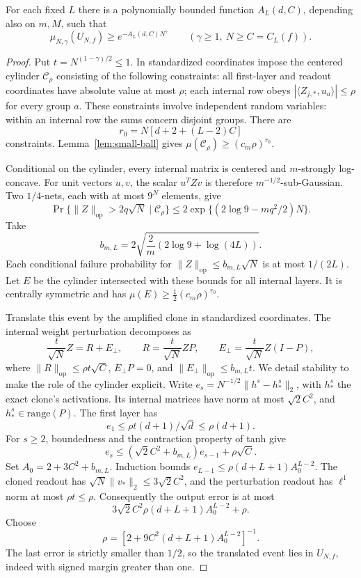 \begin{proposition}\label{prop:target-mass}
For each fixed $L$ there is a polynomially bounded function $A_L(d,C)$,
depending also on $m,M$, such that
\begin{equation}\label{eq:target-mass}
 \mu_{N,\gamma}(U_{N,f})\geq e^{-A_L(d,C)N^\gamma}
 \qquad(\gamma\geq1,\ N\geq C=C_L(f)).
\end{equation}
\end{proposition}
\begin{proof}
Put $t=N^{(1-\gamma)/2}\leq1$. In standardized coordinates impose the
centered cylinder $\mathcal C_\rho$ consisting of the following constraints:
all first-layer and readout coordinates have absolute value at most $\rho$;
each internal row obeys $|\langle Z_{j,*},u_a\rangle|\leq\rho$ for
every group $a$. These constraints involve independent random variables:
within an internal row the sums concern disjoint groups. There are
\[
 r_0=N[d+2+(L-2)C]
\]
constraints. Lemma~\ref{lem:small-ball} gives
$\mu(\mathcal C_\rho)\geq(c_m\rho)^{r_0}$.

Conditional on the cylinder, every internal matrix is centered and
$m$-strongly log-concave. For unit vectors $u,v$, the scalar $u^TZv$
is therefore $m^{-1/2}$-sub-Gaussian. Two $1/4$-nets, each with at most
$9^N$ elements, give
\[
 \Pr\{\|Z\|_{\mathrm{op}}>2q\sqrt N\mid\mathcal C_\rho\}
 \leq2\exp\{(2\log9-mq^2/2)N\}.
\]
Take
\[
 b_{m,L}=2\sqrt{\frac2m(2\log9+\log(4L))}.
\]
Each conditional failure probability for
$\|Z\|_{\mathrm{op}}\leq b_{m,L}\sqrt N$ is at most $1/(2L)$.
Let $E$ be the cylinder intersected with these bounds for all internal
layers. It is centrally symmetric and has
$\mu(E)\geq\tfrac12(c_m\rho)^{r_0}$.

Translate this event by the amplified clone in standardized coordinates.
The internal weight perturbation decomposes as
\[
 \frac t{\sqrt N}Z=R+E_\perp,
 \qquad R=\frac t{\sqrt N}ZP,
 \qquad E_\perp=\frac t{\sqrt N}Z(I-P),
\]
where
$\|R\|_{\mathrm{op}}\leq\rho t\sqrt C$,
$E_\perp P=0$, and $\|E_\perp\|_{\mathrm{op}}\leq b_{m,L}t$.
We detail stability to make the role of the cylinder explicit. Write
$e_s=N^{-1/2}\|h^s-h_*^s\|_2$, with $h_*^s$ the exact clone's
activations. Its internal matrices have norm at most $\sqrt2C^2$, and
$h_*^s\in\mathrm{range}(P)$. The first layer has
\[
 e_1\leq \rho t(d+1)/\sqrt d\leq\rho(d+1).
\]
For $s\geq2$, boundedness and the contraction property of tanh give
\[
 e_s\leq(\sqrt2C^2+b_{m,L})e_{s-1}+\rho\sqrt C.
\]
Set $A_0=2+3C^2+b_{m,L}$. Induction bounds
$e_{L-1}\leq\rho(d+L+1)A_0^{L-2}$.
The cloned readout has $\sqrt N\|v_*\|_2\leq3\sqrt2 C^2$,
and the perturbation readout has $\ell^1$ norm at most $\rho t\leq\rho$.
Consequently the output error is at most
\[
 3\sqrt2 C^2\rho(d+L+1)A_0^{L-2}+\rho.
\]
Choose
\[
 \rho=[2+9C^2(d+L+1)A_0^{L-2}]^{-1}.
\]
The last error is strictly smaller than $1/2$, so the translated event
lies in $U_{N,f}$, indeed with signed margin greater than one.


\end{proof}
